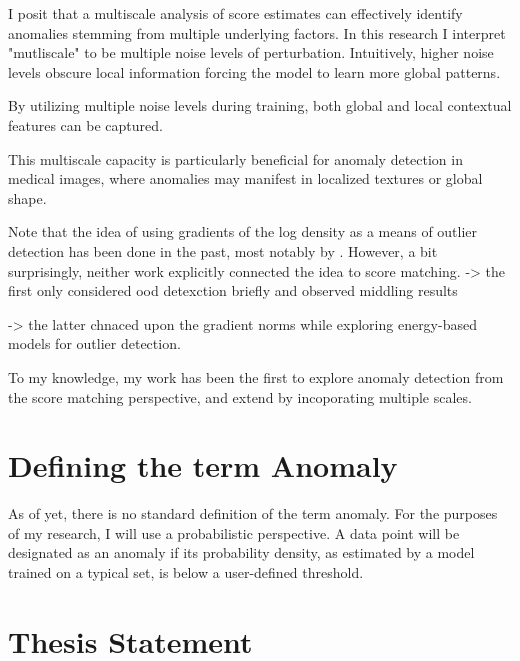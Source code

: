 I posit that a multiscale analysis of score estimates can effectively identify anomalies stemming from multiple underlying factors. In this research I interpret "mutliscale" to be multiple noise levels of perturbation.
Intuitively, higher noise levels obscure local information forcing the model to learn more global patterns. 

By utilizing multiple noise levels during training, both global and local contextual features can be captured.

This multiscale capacity is particularly beneficial for anomaly detection in medical images, where anomalies may manifest in localized textures or global shape.

Note that the idea of using gradients of the log density  as a means of outlier detection has been done in the past, most notably by . However, a bit surprisingly, neither work explicitly connected the idea to score matching. 
-> the first only considered ood detexction briefly and observed middling results

-> the latter chnaced upon the gradient norms while exploring  energy-based models for outlier detection.

To my knowledge, my work has been the first to explore anomaly detection from the score matching perspective, and extend by incoporating multiple scales.


\section{Defining the term Anomaly}
As of yet, there is no standard definition of the term anomaly. 
For the purposes of my research, I will use a probabilistic perspective. A data point will be designated as an anomaly if its probability density, as estimated by a model trained on a typical set, is below a user-defined threshold. 


\section{Thesis Statement}


